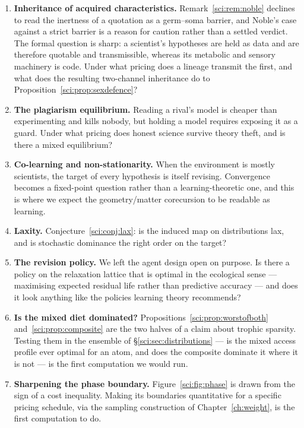 \begin{enumerate}
\item \label{sci:op:noble} \textbf{Inheritance of acquired characteristics.} Remark~\ref{sci:rem:noble}
declines to read the inertness of a quotation as a germ--soma barrier, and Noble's case against a
strict barrier \cite{Noble} is a reason for caution rather than a settled verdict. The formal question
is sharp: a scientist's hypotheses are held as data and are therefore quotable and transmissible,
whereas its metabolic and sensory machinery is code. Under what pricing does a lineage transmit the
first, and what does the resulting two-channel inheritance do to
Proposition~\ref{sci:prop:sexdefence}?

\item \textbf{The plagiarism equilibrium.} Reading a rival's model is cheaper than experimenting and
kills nobody, but holding a model requires exposing it as a guard. Under what pricing does honest
science survive theory theft, and is there a mixed equilibrium?

\item \textbf{Co-learning and non-stationarity.} When the environment is mostly scientists, the target
of every hypothesis is itself revising. Convergence becomes a fixed-point question rather than a
learning-theoretic one, and this is where we expect the geometry/matter corecursion to be readable as
learning.

\item \textbf{Laxity.} Conjecture~\ref{sci:conj:lax}: is the induced map on distributions lax, and is
stochastic dominance the right order on the target?

\item \textbf{The revision policy.} We left the agent design open on purpose. Is there a policy on the
relaxation lattice that is optimal in the ecological sense --- maximising expected residual life
rather than predictive accuracy --- and does it look anything like the policies learning theory
recommends?

\item \textbf{Is the mixed diet dominated?} Propositions~\ref{sci:prop:worstofboth}
and~\ref{sci:prop:composite} are the two halves of a claim about trophic sparsity. Testing them in the
ensemble of \S\ref{sci:sec:distributions} --- is the mixed access profile ever optimal for an atom, and
does the composite dominate it where it is not --- is the first computation we would run.

\item \textbf{Sharpening the phase boundary.} Figure~\ref{sci:fig:phase} is drawn from the sign of a cost
inequality. Making its boundaries quantitative for a specific pricing schedule, via the sampling
construction of Chapter~\ref{ch:weight}, is the first computation to do.
\end{enumerate}


